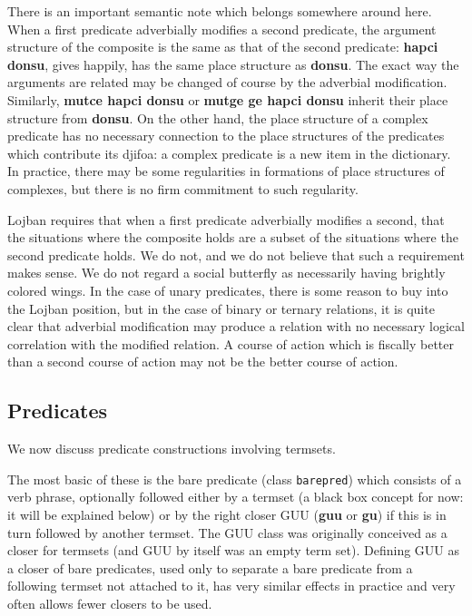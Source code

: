 \documentclass[12pt]{book}
\begin{document}
{There is an important semantic note which belongs somewhere around here.  When a first predicate adverbially modifies a second predicate, the argument structure of the composite is the same as that of the second predicate:  {\bf hapci donsu}, gives happily, has the same place structure as {\bf donsu}.  The exact way the arguments are related may be changed of course by the adverbial modification.   Similarly, {\bf mutce hapci donsu} or {\bf mutge ge hapci donsu} inherit their place structure from {\bf donsu}.  On the other hand, the place structure of a complex predicate
has no necessary connection to the place structures of the predicates which contribute its djifoa:  a complex predicate is a new item in the dictionary.  In practice, there may be some regularities in formations of place structures of complexes, but there is no firm commitment to such regularity.

Lojban requires that when a first predicate adverbially modifies a second, that the situations where the composite holds are a subset of the situations where the  second predicate holds.  We do not, and we do not believe that such a requirement makes sense.  We do not regard a social butterfly as necessarily having brightly colored wings.  In the case of unary predicates, there is some reason to buy into the Lojban position, but in the case of binary or ternary relations, it is quite clear that adverbial modification may produce a relation with no necessary logical correlation with the modified relation.  A course of action which is fiscally better than a second course of action may not be the better course of action.

\subsection{Predicates}

We now discuss predicate constructions involving termsets.

The most basic of these is the bare predicate (class {\tt barepred}) which consists of a verb phrase, optionally  followed either by a termset (a black box concept for now:  it will be explained below) or by the right closer GUU ({\bf guu} or {\bf gu}) if this is in turn followed by another termset.  The GUU class was originally conceived as a closer for termsets (and GUU by itself was an empty term set).  Defining GUU as a closer of bare predicates, used only to separate
a bare predicate from a following termset not attached to it, has very similar effects in practice and very often allows fewer closers to be used.

}
\end{document}
